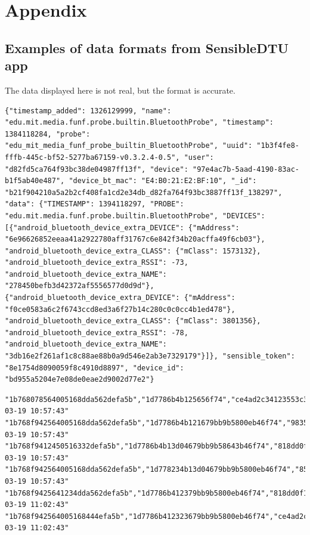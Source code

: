 \chapter{Appendix}

\section{Examples of data formats from SensibleDTU app}

The data displayed here is not real, but the format is accurate. 

\begin{lstlisting}
{"timestamp_added": 1326129999, "name": "edu.mit.media.funf.probe.builtin.BluetoothProbe", "timestamp": 1384118284, "probe": "edu_mit_media_funf_probe_builtin_BluetoothProbe", "uuid": "1b3f4fe8-fffb-445c-bf52-5277ba67159-v0.3.2.4-0.5", "user": "d82fd5ca764f93bc38de04987ff13f", "device": "97e4ac7b-5aad-4190-83ac-b1f5ab40e487", "device_bt_mac": "E4:B0:21:E2:BF:10", "_id": "b21f904210a5a2b2cf408fa1cd2e34db_d82fa764f93bc3887ff13f_138297", "data": {"TIMESTAMP": 1394118297, "PROBE": "edu.mit.media.funf.probe.builtin.BluetoothProbe", "DEVICES": [{"android_bluetooth_device_extra_DEVICE": {"mAddress": "6e96626852eeaa41a2922780aff31767c6e842f34b20acffa49f6cb03"}, "android_bluetooth_device_extra_CLASS": {"mClass": 1573132}, "android_bluetooth_device_extra_RSSI": -73, "android_bluetooth_device_extra_NAME": "278450befb3d42372af5556577d0d9d"}, {"android_bluetooth_device_extra_DEVICE": {"mAddress": "f0ce0583a6c2f6743ccd8ed3a6f27b14c280c0c0cc4b1ed478"}, "android_bluetooth_device_extra_CLASS": {"mClass": 3801356}, "android_bluetooth_device_extra_RSSI": -78, "android_bluetooth_device_extra_NAME": "3db16e2f261af1c8c88ae88b0a9d546e2ab3e7329179"}]}, "sensible_token": "8e1754d8090059f8c4910d8897", "device_id": "bd955a5204e7e08de0eae2d9002d77e2"}
\end{lstlisting}

\begin{lstlisting}
"1b768078564005168dda562defa5b","1d7786b4b125656f74","ce4ad2c34123553c3b72b60e4eab19971456f5f391ed7","-82","2014-03-19 10:57:43"
"1b768f942564005168dda562defa5b","1d7786b4b121679bb9b5800eb46f74","9835c86c172aa3398564112455b42f54009a1ce37478d905f998d3f6c7","-73","2014-03-19 10:57:43"
"1b768f9412450516332defa5b","1d7786b4b13d04679bb9b58643b46f74","818dd0f1afd862c52b112262709c641b1995567ba28c3c20e","-57","2014-03-19 10:57:43"
"1b768f942564005168dda562defa5b","1d778234b13d04679bb9b5800eb46f74","8547c45679a561f8cbfff70de8572f161206ea06ce380a973","-88","2014-03-19 10:57:43"
"1b768f9425641234dda562defa5b","1d7786b412379bb9b5800eb46f74","818dd0f1afd862c52b8bdd65c37562709c641b19977c4ba1315057ba28c3c20e","-55","2014-03-19 11:02:43"
"1b768f942564005168444efa5b","1d7786b412323679bb9b5800eb46f74","ce4ad2c3477aef48ca1431004c023c3b72b60e4eab199712391ed7","-90","2014-03-19 11:02:43"
\end{lstlisting}


